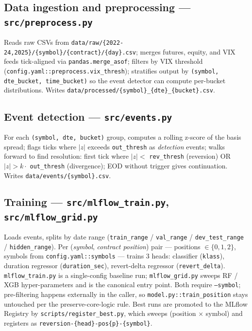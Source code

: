 \documentclass[11pt,a4paper]{article}
\begin{document}
\subsection{Data ingestion and preprocessing --- \texttt{src/preprocess.py}}
Reads raw CSVs from \texttt{data/raw/\{2022-24,2025\}/\{symbol\}/\{contract\}/\{day\}.csv}; merges futures, equity, and VIX feeds tick-aligned via \texttt{pandas.merge\_asof}; filters by VIX threshold
\\
(\texttt{config.yaml::preprocess.vix\_thresh}); stratifies output by \texttt{(symbol, dte\_bucket, time\_bucket)} so the event detector can compute per-bucket distributions. Writes \texttt{data/processed/\{symbol\}\_\{dte\}\_\{bucket\}.csv}.

\subsection{Event detection --- \texttt{src/events.py}}
For each \texttt{(symbol, dte, bucket)} group, computes a rolling z-score of the basis spread; flags ticks where $|z|$ exceeds \texttt{out\_thresh} as \emph{detection} events; walks forward to find resolution: first tick where $|z|<$ \texttt{rev\_thresh} (reversion) OR $|z|>k\cdot$ \texttt{out\_thresh} (divergence); EOD without trigger gives continuation. Writes \texttt{data/events/\{symbol\}.csv}.

\subsection{Training --- \texttt{src/mlflow\_train.py}, \texttt{src/mlflow\_grid.py}}
Loads events, splits by date range (\texttt{train\_range} / \texttt{val\_range} / \texttt{dev\_test\_range} / \texttt{hidden\_range}). Per (\emph{symbol}, \emph{contract position}) pair --- positions $\in\{0,1,2\}$, symbols from \texttt{config.yaml::symbols} --- trains 3 heads: classifier (\texttt{klass}), duration regressor (\texttt{duration\_sec}), revert-delta regressor (\texttt{revert\_delta}). \texttt{mlflow\_train.py} is a single-config baseline run; \texttt{mlflow\_grid.py} sweeps RF / XGB hyper-parameters and is the canonical entry point. Both require \texttt{--symbol}; pre-filtering happens externally in the caller, so \texttt{model.py::train\_position} stays untouched per the preserve-core-logic rule. Best runs are promoted to the MLflow Registry by \texttt{scripts/register\_best.py}, which sweeps (position $\times$ symbol) and registers as \texttt{reversion-\{head\}-pos\{p\}-\{symbol\}}.
\end{document}
